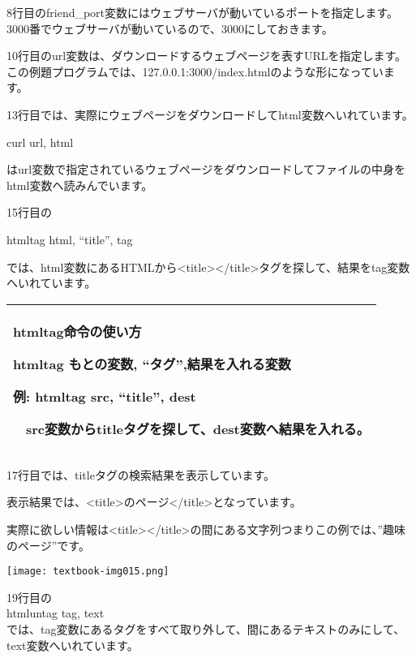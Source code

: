 8行目のfriend\_port変数にはウェブサーバが動いているポートを指定します。
3000番でウェブサーバが動いているので、3000にしておきます。



10行目のurl変数は、ダウンロードするウェブページを表すURLを指定します。
この例題プログラムでは、127.0.0.1:3000/index.htmlのような形になっています。

13行目では、実際にウェブページをダウンロードしてhtml変数へいれています。

curl url, html

はurl変数で指定されているウェブページをダウンロードしてファイルの中身をhtml変数へ読みんでいます。

\clearpage
15行目の

htmltag html, “title”, tag

では、html変数にあるHTMLから{\textless}title{\textgreater}{\textless}/title{\textgreater}タグを探して、結果をtag変数へいれています。

\begin{center}
\tablefirsthead{}
\tablehead{}
\tabletail{}
\tablelasttail{}
\begin{supertabular}{|m{16.806cm}|}
\hline
htmltag命令の使い方

\textbf{htmltag} \textbf{もとの変数, “タグ”,結果を入れる変数}

例: htmltag src, “title”, dest

　src変数からtitleタグを探して、dest変数へ結果を入れる。\\\hline
\end{supertabular}
\end{center}


17行目では、titleタグの検索結果を表示しています。

表示結果では、{\textless}title{\textgreater}のページ{\textless}/title{\textgreater}となっています。

実際に欲しい情報は{\textless}title{\textgreater}{\textless}/title{\textgreater}の間にある文字列つまりこの例では、”趣味のページ”です。

\begin{center}
  \texttt{[image: textbook-img015.png]}
\end{center}

\clearpage
19行目の\\
htmluntag tag, text\\
では、tag変数にあるタグをすべて取り外して、間にあるテキストのみにして、text変数へいれています。


